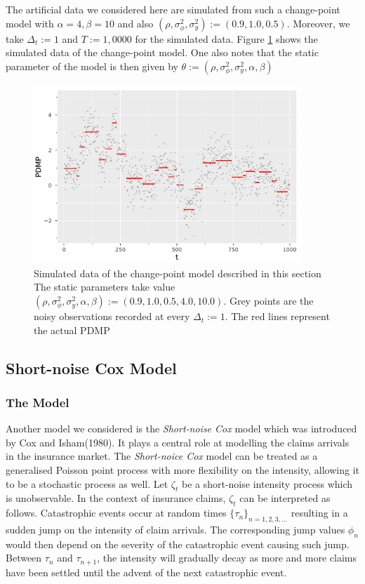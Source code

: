 \documentclass[12pt,a4paper]{article}
\begin{document}
The artificial data we considered here are simulated from such a change-point model with \(\alpha=4,\beta=10\) and also \((\rho,\sigma_\phi^2,\sigma^2_y):= (0.9,1.0,0.5)\). Moreover, we take \(\Delta_t := 1\) and \(T:=1,0000\) for the simulated data. Figure \ref{Fig:Changpoint Data} shows the simulated data of the change-point model. One also notes that the static parameter of the model is then given by \(\theta:= (\rho,\sigma_\phi^2,\sigma_y^2,\alpha,\beta)\)
\begin{figure}[t!]
    \centering
    \includegraphics[width=0.9\textwidth]{CP_data.pdf}
    \caption{Simulated data of the change-point model described in this section The static parameters take value \((\rho,\sigma_\phi^2,\sigma_y^2,\alpha,\beta):=(0.9,1.0,0.5,4.0,10.0)\). Grey points are the noisy observations recorded at every \(\Delta_t := 1\). The red lines represent the actual PDMP}
    \label{Fig:Changpoint Data}
\end{figure}
\subsection{Short-noise Cox Model}
\subsubsection{The Model}
Another model we considered is the \textit{Short-noise Cox} model which was introduced by Cox and Isham(1980). It plays a central role at modelling the claims arrivals in the insurance market. The \textit{Short-noice Cox} model can be treated as a generalised Poisson point process with more flexibility on the intensity, allowing it to be a stochastic process as well. Let \(\zeta_t\) be a short-noise intensity process which is unobservable. In the context of insurance claims, \(\zeta_t\) can be interpreted as follows. Catastrophic events occur at random times \(\{\tau_n\}_{n=1,2,3,...}\) resulting in a sudden jump on the intensity of claim arrivals. The corresponding jump values \(\phi_n\) would then depend on the severity of the catastrophic event causing such jump. Between \(\tau_n\) and \(\tau_{n+1}\), the intensity will gradually decay as more and more claims have been settled until the advent of the next catastrophic event. 
\end{document}
